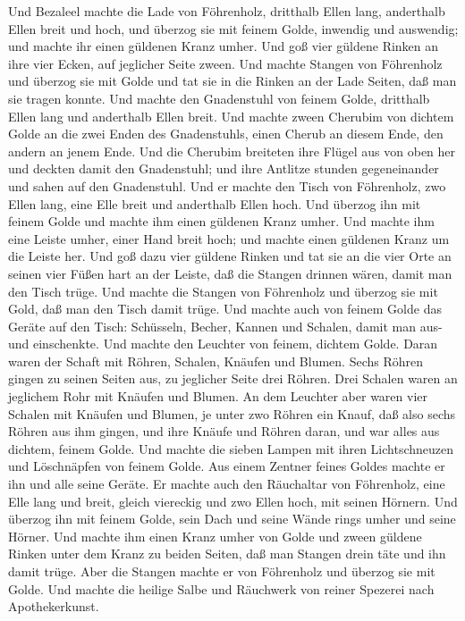  Und Bezaleel machte die Lade von Föhrenholz, dritthalb
Ellen lang, anderthalb Ellen breit und hoch,  und überzog
sie mit feinem Golde, inwendig und auswendig; und machte ihr einen
güldenen Kranz umher.  Und goß vier güldene Rinken an ihre
vier Ecken, auf jeglicher Seite zween.  Und machte Stangen
von Föhrenholz und überzog sie mit Golde  und tat sie in die
Rinken an der Lade Seiten, daß man sie tragen konnte.  Und
machte den Gnadenstuhl von feinem Golde, dritthalb Ellen lang und
anderthalb Ellen breit.  Und machte zween Cherubim von
dichtem Golde an die zwei Enden des Gnadenstuhls,  einen
Cherub an diesem Ende, den andern an jenem Ende.  Und die
Cherubim breiteten ihre Flügel aus von oben her und deckten damit den
Gnadenstuhl; und ihre Antlitze stunden gegeneinander und sahen auf den
Gnadenstuhl.  Und er machte den Tisch von Föhrenholz, zwo
Ellen lang, eine Elle breit und anderthalb Ellen hoch.  Und
überzog ihn mit feinem Golde und machte ihm einen güldenen Kranz umher.
 Und machte ihm eine Leiste umher, einer Hand breit hoch;
und machte einen güldenen Kranz um die Leiste her.  Und goß
dazu vier güldene Rinken und tat sie an die vier Orte an seinen vier
Füßen  hart an der Leiste, daß die Stangen drinnen wären,
damit man den Tisch trüge.  Und machte die Stangen von
Föhrenholz und überzog sie mit Gold, daß man den Tisch damit trüge.
 Und machte auch von feinem Golde das Geräte auf den Tisch:
Schüsseln, Becher, Kannen und Schalen, damit man aus- und einschenkte.
 Und machte den Leuchter von feinem, dichtem Golde. Daran
waren der Schaft mit Röhren, Schalen, Knäufen und Blumen. 
Sechs Röhren gingen zu seinen Seiten aus, zu jeglicher Seite drei
Röhren.  Drei Schalen waren an jeglichem Rohr mit Knäufen
und Blumen.  An dem Leuchter aber waren vier Schalen mit
Knäufen und Blumen,  je unter zwo Röhren ein Knauf, daß
also sechs Röhren aus ihm gingen,  und ihre Knäufe und
Röhren daran, und war alles aus dichtem, feinem Golde.  Und
machte die sieben Lampen mit ihren Lichtschneuzen und Löschnäpfen von
feinem Golde.  Aus einem Zentner feines Goldes machte er
ihn und alle seine Geräte.  Er machte auch den Räuchaltar
von Föhrenholz, eine Elle lang und breit, gleich viereckig und zwo Ellen
hoch, mit seinen Hörnern.  Und überzog ihn mit feinem
Golde, sein Dach und seine Wände rings umher und seine Hörner. Und
machte ihm einen Kranz umher von Golde  und zween güldene
Rinken unter dem Kranz zu beiden Seiten, daß man Stangen drein täte und
ihn damit trüge.  Aber die Stangen machte er von Föhrenholz
und überzog sie mit Golde.  Und machte die heilige Salbe
und Räuchwerk von reiner Spezerei nach Apothekerkunst.

